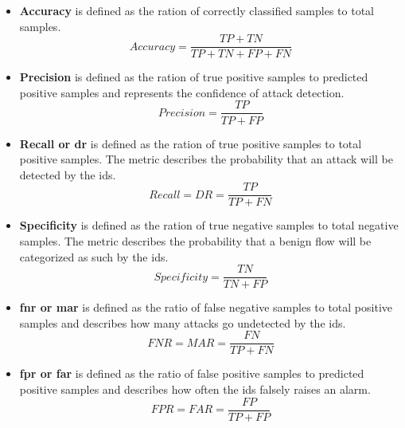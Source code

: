 \begin{itemize}
	\item \textbf{Accuracy} is defined as the ration of correctly classified samples to total samples. \begin{equation}
	Accuracy = \frac{TP + TN}{TP + TN + FP + FN}
	\end{equation}
	
	\item \textbf{Precision} is defined as the ration of true positive samples to predicted positive samples and represents the confidence of attack detection.
	 \begin{equation}
	Precision = \frac{TP}{TP + FP}
	\end{equation}
	
	\item \textbf{Recall or \gls{dr}} is defined as the ration of true positive samples to total positive samples. The metric describes the probability that an attack will be detected by the \gls{ids}.
	\begin{equation}
	Recall = DR = \frac{TP}{TP + FN}
	\end{equation}
	
	\item \textbf{Specificity} is defined as the ration of true negative samples to total negative samples. The metric describes the probability that a benign flow will be categorized as such by the \gls{ids}.
	\begin{equation}
	Specificity = \frac{TN}{TN + FP}
	\end{equation}
	
	\item \textbf{\gls{fnr} or \gls{mar}} is defined as the ratio of false negative samples to total positive samples and describes how many attacks go undetected by the \gls{ids}.
	\begin{equation}
	FNR = MAR = \frac{FN}{TP + FN}
	\end{equation}
	
	\item \textbf{\gls{fpr} or \gls{far}} is defined as the ratio of false positive samples to predicted positive samples and describes how often the \gls{ids} falsely raises an alarm.
	\begin{equation}
	FPR = FAR = \frac{FP}{TP + FP}
	\end{equation}
\end{itemize}


\printglossaries
